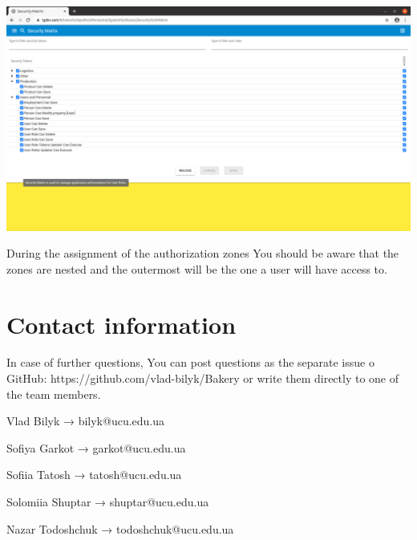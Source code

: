 \includegraphics[width=\textwidth]{sections/01-chapter/images/system155.png}

During the assignment of the authorization zones You should be aware that the zones are nested and the outermost will be the one a user will have access to. 

\section{Contact information}
In case of further questions, You can post questions as the separate issue o GitHub: https://github.com/vlad-bilyk/Bakery or write them directly to one of the team members. 

Vlad Bilyk  →  bilyk@ucu.edu.ua

Sofiya Garkot  →  garkot@ucu.edu.ua

Sofiia Tatosh  →  tatosh@ucu.edu.ua

Solomiia Shuptar  →  shuptar@ucu.edu.ua

Nazar Todoshchuk  →  todoshchuk@ucu.edu.ua

